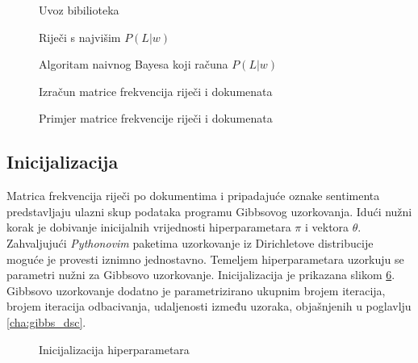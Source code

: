 \begin{figure}

\caption{Uvoz bibilioteka}
\label{alg:import}
\end{figure}

\begin{figure}

\caption{Riječi s najvišim $P(L|w)$}
\label{alg:most_info}
\end{figure}

\begin{figure}

\caption{Algoritam naivnog Bayesa koji računa $P(L|w)$}
\label{alg:naive_bayes}
\end{figure}

\begin{figure}

\caption{Izračun matrice frekvencija riječi i dokumenata}
\label{alg:word_doc_freq}
\end{figure}

\begin{figure}
\centering

\caption{Primjer matrice frekvencije riječi i dokumenata}
\label{alg:mat_word_freq}
\end{figure}

\subsection{Inicijalizacija}

Matrica frekvencija riječi po dokumentima i pripadajuće oznake sentimenta predstavljaju ulazni skup podataka programu Gibbsovog uzorkovanja. Idući nužni korak je dobivanje inicijalnih vrijednosti hiperparametara $\pi$ i vektora $\theta$. Zahvaljujući \textit{Pythonovim} paketima uzorkovanje iz Dirichletove distribucije moguće je provesti iznimno jednostavno. Temeljem hiperparametara uzorkuju se parametri nužni za Gibbsovo uzorkovanje. Inicijalizacija je prikazana slikom \ref{alg:hyp_params}. Gibbsovo uzorkovanje dodatno je parametrizirano ukupnim brojem iteracija, brojem iteracija odbacivanja, udaljenosti između uzoraka, objašnjenih u poglavlju \ref{cha:gibbs_dsc}.

\begin{figure}

\caption{Inicijalizacija hiperparametara}
\label{alg:hyp_params}
\end{figure}

